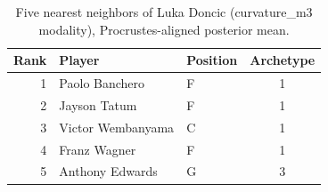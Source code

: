 \begin{table}[htbp]
  \centering\small
  \begin{tabular}{rllc}
    \toprule
    Rank & Player & Position & Archetype \\
    \midrule
    1 & Paolo Banchero & F & 1 \\
    2 & Jayson Tatum & F & 1 \\
    3 & Victor Wembanyama & C & 1 \\
    4 & Franz Wagner & F & 1 \\
    5 & Anthony Edwards & G & 3 \\
    \bottomrule
  \end{tabular}
  \caption{Five nearest neighbors of Luka Doncic (curvature_m3 modality), Procrustes-aligned posterior mean.}
  \label{tab:Luka_Doncic_neighbors_curvature_m3}
\end{table}

